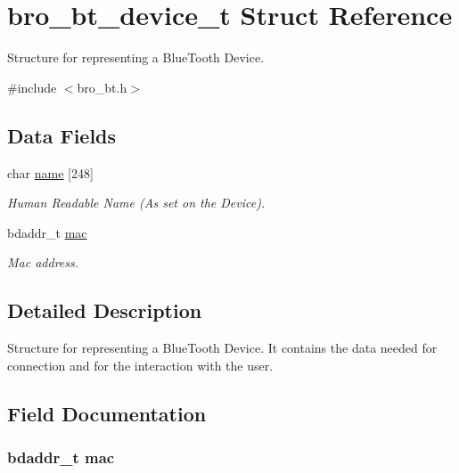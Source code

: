 \hypertarget{structbro__bt__device__t}{
\section{bro\_\-bt\_\-device\_\-t Struct Reference}
\label{structbro__bt__device__t}
}


Structure for representing a BlueTooth Device.  




{\ttfamily \#include $<$bro\_\-bt.h$>$}

\subsection*{Data Fields}
\begin{DoxyCompactItemize}
\item 
char \hyperlink{structbro__bt__device__t_ab68bf00ae4a0036aee3d3371354748de}{name} \mbox{[}248\mbox{]}
\begin{DoxyCompactList}\small\item\em Human Readable Name (As set on the Device). \item\end{DoxyCompactList}\item 
bdaddr\_\-t \hyperlink{structbro__bt__device__t_a948e84481473311b7e41236653773e60}{mac}
\begin{DoxyCompactList}\small\item\em Mac address. \item\end{DoxyCompactList}\end{DoxyCompactItemize}


\subsection{Detailed Description}
Structure for representing a BlueTooth Device. It contains the data needed for connection and for the interaction with the user. 

\subsection{Field Documentation}
\hypertarget{structbro__bt__device__t_a948e84481473311b7e41236653773e60}{
\subsubsection[{mac}]{\setlength{\rightskip}{0pt plus 5cm}bdaddr\_\-t {\bf mac}}}
\label{structbro__bt__device__t_a948e84481473311b7e41236653773e60}


